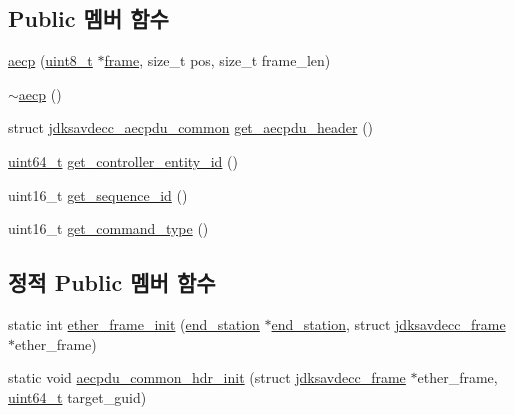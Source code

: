 \subsection*{Public 멤버 함수}
\begin{DoxyCompactItemize}
\item 
\hyperlink{classavdecc__lib_1_1aecp_ae1ac853c21a808d40791d17d86d8735a}{aecp} (\hyperlink{stdint_8h_aba7bc1797add20fe3efdf37ced1182c5}{uint8\+\_\+t} $\ast$\hyperlink{gst__avb__playbin_8c_ac8e710e0b5e994c0545d75d69868c6f0}{frame}, size\+\_\+t pos, size\+\_\+t frame\+\_\+len)
\item 
\hyperlink{classavdecc__lib_1_1aecp_a40c480b895e3027bff90c174a59330e3}{$\sim$aecp} ()
\item 
struct \hyperlink{structjdksavdecc__aecpdu__common}{jdksavdecc\+\_\+aecpdu\+\_\+common} \hyperlink{classavdecc__lib_1_1aecp_a05a7a710e2f8cbc779bc768bc1eb3a52}{get\+\_\+aecpdu\+\_\+header} ()
\item 
\hyperlink{parse_8c_aec6fcb673ff035718c238c8c9d544c47}{uint64\+\_\+t} \hyperlink{classavdecc__lib_1_1aecp_ad9f27efe79cf01e03b757a8edaa332d9}{get\+\_\+controller\+\_\+entity\+\_\+id} ()
\item 
uint16\+\_\+t \hyperlink{classavdecc__lib_1_1aecp_a03822a6b154759c1fdce127498c77df1}{get\+\_\+sequence\+\_\+id} ()
\item 
uint16\+\_\+t \hyperlink{classavdecc__lib_1_1aecp_ae81be9177dc99d53bc6473a4eea12f57}{get\+\_\+command\+\_\+type} ()
\end{DoxyCompactItemize}
\subsection*{정적 Public 멤버 함수}
\begin{DoxyCompactItemize}
\item 
static int \hyperlink{classavdecc__lib_1_1aecp_a753653f0cfa951bd0fc08e68f94ddf25}{ether\+\_\+frame\+\_\+init} (\hyperlink{classavdecc__lib_1_1end__station}{end\+\_\+station} $\ast$\hyperlink{classavdecc__lib_1_1end__station}{end\+\_\+station}, struct \hyperlink{structjdksavdecc__frame}{jdksavdecc\+\_\+frame} $\ast$ether\+\_\+frame)
\item 
static void \hyperlink{classavdecc__lib_1_1aecp_a716fe5f17859621774dfa612eb639409}{aecpdu\+\_\+common\+\_\+hdr\+\_\+init} (struct \hyperlink{structjdksavdecc__frame}{jdksavdecc\+\_\+frame} $\ast$ether\+\_\+frame, \hyperlink{parse_8c_aec6fcb673ff035718c238c8c9d544c47}{uint64\+\_\+t} target\+\_\+guid)
\end{DoxyCompactItemize}
